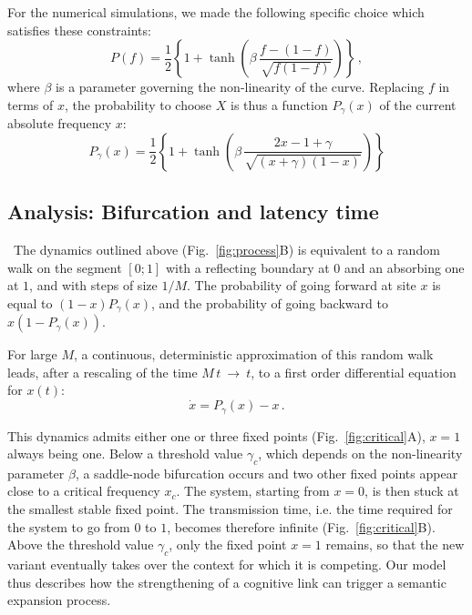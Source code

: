 \documentclass[12pt,twocolumn,amsmath,amssymb,aps,longbibliography]{revtex4-1}  %
\newcommand{\beq}{\begin{equation}}
\newcommand{\eneq}{\end{equation}}
\begin{document}
For the numerical simulations, we made the following specific choice which satisfies these constraints:
{\small\beq
P(f) = \frac{1}{2} \left\{ 1 + \tanh \left( \beta \, \frac{f - (1 - f)}{\sqrt{f(1 - f)}} \right) \right \} \,,
\eneq}
where $\beta$ is a parameter governing the non-linearity of the curve. Replacing $f$ in terms of $x$, the probability to choose $X$ is thus a function $P_{\gamma}(x)$ of the current absolute frequency $x$:
{\small\beq
P_{\gamma}(x) = \frac{1}{2} \left\{ 1 + \tanh \left( \beta \, \frac{2x- 1+\gamma}{\sqrt{(x+\gamma)(1-x)}} \right) \right \} 
\eneq
}

\subsection*{Analysis: Bifurcation and latency time}
\ The dynamics outlined above (Fig.~\ref{fig:process}B) is equivalent to a random walk on the segment $[0;1]$ with a reflecting boundary at $0$ and an absorbing one at $1$, and with steps of size $1/M$. The probability of going forward at site $x$ is equal to $(1-x)P_{\gamma}(x)$, and the probability of going backward to $x(1-P_{\gamma}(x))$. 

For large $M$, a continuous, deterministic approximation of this random walk leads, after a rescaling of the time $M\,t~\rightarrow~t$, to a first order differential equation for $x(t)$:
{\small\beq \label{speed}
\dot{x} = P_{\gamma}(x) -x \,.
\eneq}

This dynamics admits either one or three fixed points (Fig.~\ref{fig:critical}A), $x = 1$ always being one. Below a threshold value $\gamma_c$, which depends on the non-linearity parameter $\beta$, a saddle-node bifurcation occurs and two other fixed points appear close to a critical frequency $x_c$. The system, starting from $x = 0$, 
is then stuck at the smallest stable fixed point. The transmission time, i.e. the time required for the system to go from $0$ to $1$, becomes therefore infinite (Fig.~\ref{fig:critical}B). Above the threshold value $\gamma_c$, only the fixed point $x = 1$ remains, so that the new variant eventually takes over the context for which it is competing. Our model thus describes how the strengthening of a cognitive link can trigger a semantic expansion process. 

\begin{figure*}[!tbp]
\caption{\small Evidence of a near-critical behavior. (A)~Speed $\dot{x}$ of the deterministic process for each of the sites, for different values of $\beta$ and $\delta = (\gamma - \gamma_c) / \gamma_c$, the distance to threshold.  Depending on the sign of $\delta$, there is either one or three fixed points. (B)~Inverse transmission time (time required for the system to go from $0$ to $1$), for the deterministic process (blue dotted line), and for the averaged stochastic process (green line), as a function of the control parameter $\delta$. Deterministic transmission time diverges at the transition while averaged stochastic transmission time remains finite.}
\label{fig:critical}
\end{figure*}
\end{document}
